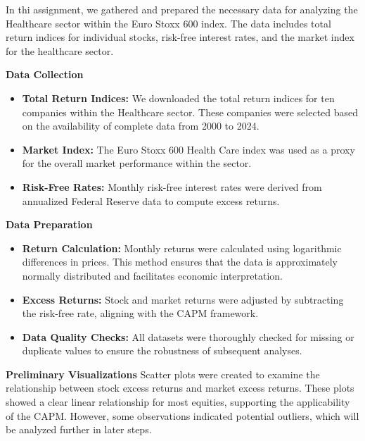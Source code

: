 In thi assignment, we gathered and prepared the necessary data for analyzing the Healthcare sector within the Euro Stoxx 600
index. 
The data includes total return indices for individual stocks, risk-free interest rates, and the market index for the
healthcare sector.

\textbf{Data Collection}
\begin{itemize}
    \item \textbf{Total Return Indices:} We downloaded the total return indices for ten companies within the Healthcare sector.
    These companies were selected based on the availability of complete data from 2000 to 2024.
    \item \textbf{Market Index:} The Euro Stoxx 600 Health Care index was used as a proxy for the overall market performance
    within the sector.
    \item \textbf{Risk-Free Rates:} Monthly risk-free interest rates were derived from annualized Federal Reserve data to
    compute excess returns.
\end{itemize}

\textbf{Data Preparation}

\begin{itemize}
    \item \textbf{Return Calculation:} Monthly returns were calculated using logarithmic differences in prices. This method 
    ensures that the data is approximately normally distributed and facilitates economic interpretation.
    \item \textbf{Excess Returns:} Stock and market returns were adjusted by subtracting the risk-free rate, aligning with the 
    CAPM framework.
    \item \textbf{Data Quality Checks:} All datasets were thoroughly checked for missing or duplicate values to ensure the 
    robustness of subsequent analyses.

\end{itemize}

\textbf{Preliminary Visualizations}
Scatter plots were created to examine the relationship between stock excess returns and market excess returns. 
These plots showed a clear linear relationship for most equities, supporting the applicability of the CAPM. 
However, some observations indicated potential outliers, which will be analyzed further in later steps.